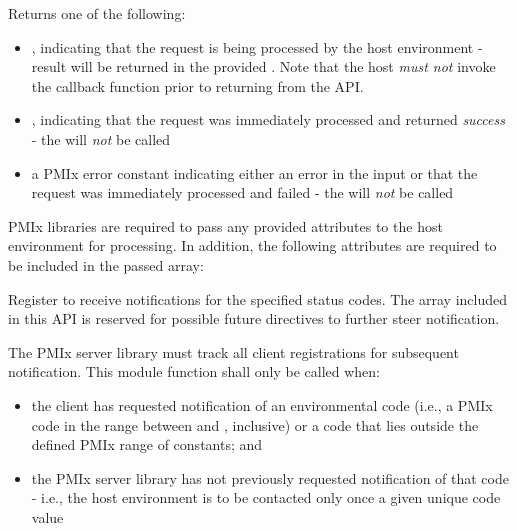 \begin{arglist}
\end{arglist}

Returns one of the following:

\begin{itemize}
    \item {}, indicating that the request is being processed by the host environment - result will be returned in the provided . Note that the host \emph{must not} invoke the callback function prior to returning from the \ac{API}.
    \item {}, indicating that the request was immediately processed and returned \textit{success} - the  will \textit{not} be called
    \item a PMIx error constant indicating either an error in the input or that the request was immediately processed and failed - the  will \textit{not} be called
\end{itemize}

\reqattrstart
\ac{PMIx} libraries are required to pass any provided attributes to the host environment for processing. In addition, the following attributes are required to be included in the passed  array:


\reqattrend

\descr

Register to receive notifications for the specified status codes. The  array included in this API is reserved for possible future directives to further steer notification.


\adviceimplstart
The \ac{PMIx} server library must track all client registrations for subsequent notification. This module function shall only be called when:

\begin{itemize}
    \item the client has requested notification of an environmental code (i.e., a \ac{PMIx} code in the range between  and , inclusive) or a code that lies outside the defined \ac{PMIx} range of constants; and
    \item the \ac{PMIx} server library has not previously requested notification of that code - i.e., the host environment is to be contacted only once a given unique code value
\end{itemize}

